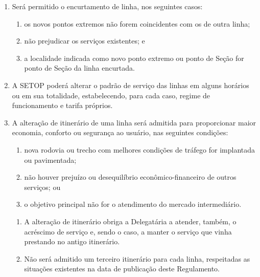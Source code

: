 \begin{enumerate}[resume, label=Art. \arabic*]
\begin{enumerate}[label= \S \arabic*]
\end{enumerate}

\item Será permitido o encurtamento de linha, nos seguintes casos:

\begin{enumerate}[label=\roman*.]

\item os novos pontos extremos não forem coincidentes com os de outra linha;

\item não prejudicar os serviços existentes; e

\item a localidade indicada como novo ponto extremo ou ponto de Seção for ponto de Seção da linha encurtada.

\end{enumerate}

\item A SETOP poderá alterar o padrão de serviço das linhas em alguns horários ou em sua totalidade, estabelecendo, para cada caso, regime de funcionamento e tarifa próprios.

\item A alteração de itinerário de uma linha será admitida para proporcionar maior economia, conforto ou segurança ao usuário, nas seguintes condições:

\begin{enumerate}[label=\roman*.]

\item nova rodovia ou trecho com melhores condições de tráfego for implantada ou pavimentada;

\item não houver prejuízo ou desequilíbrio econômico-financeiro de outros serviços; ou

\item o objetivo principal não for o atendimento do mercado intermediário.

\end{enumerate}

\begin{enumerate}[label= \S \arabic*] %

\item A alteração de itinerário obriga a Delegatária a atender, também, o acréscimo de serviço e, sendo o caso, a manter o serviço que vinha prestando no antigo itinerário.

\item Não será admitido um terceiro itinerário para cada linha, respeitadas as situações existentes na data de publicação deste Regulamento.


\end{enumerate}
\end{enumerate}
